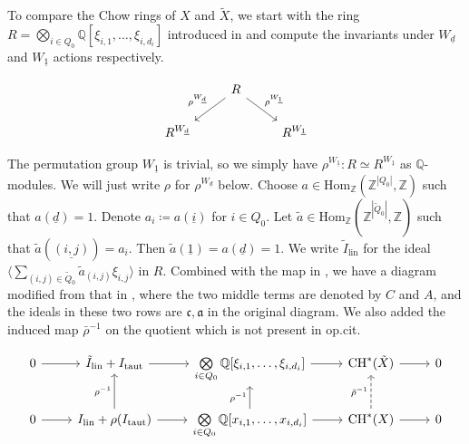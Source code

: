 \documentclass[11pt]{article}
\begin{document}
To compare the Chow rings of \(X\) and \(\tilde{X}\), we start with the ring \(R = \bigotimes_{i\in Q_0}\mathbb{Q}[\xi_{i, 1}, \dots, \xi_{i, d_i}]\) introduced in  and compute the invariants under \(W_{\underline{d}}\) and \(W_{\underline{1}}\) actions respectively. 

\[\begin{tikzcd}
	& R & \\
	{R^{W_{\underline{d}}}} && {R^{W_{\underline{1}}}}
	\arrow["{\rho^{W_{\underline{d}}}}"', from=1-2, to=2-1]
	\arrow["{\rho^{W_{\underline{1}}}}", from=1-2, to=2-3]
\end{tikzcd}\]

The permutation group \(W_{\underline{1}}\) is trivial, so we simply have \(\rho^{W_{\underline{1}}}: R\simeq R^{W_{\underline{1}}}\) as \(\mathbb{Q}\)-modules. We will just write \(\rho\) for \(\rho^{W_{\underline{d}}}\) below. Choose \(a\in \mathrm{Hom}_{\mathbb{Z}}(\mathbb{Z}^{|Q_0|}, \mathbb{Z})\) such that \(a({\underline{d}}) = 1\). Denote \(a_i\coloneqq a(\underline{i}) \) for \(i\in Q_0\). Let \(\tilde{a}\in \mathrm{Hom}_{\mathbb{Z}}(\mathbb{Z}^{|\tilde{Q}_0|}, \mathbb{Z})\) such that \(\tilde{a}(\underline{(i, j)}) = a_i\). Then \(\tilde{a}(\underline{1}) = a(\underline{d}) = 1\). We write \(\tilde{I}_{\text{lin}}\) for the ideal \(\langle \sum_{(i, j)\in \tilde{Q}_0}\tilde{a}_{(i, j)} \xi_{i,j}\rangle \) in \(R\). Combined with the map in , we have a diagram modified from that in \cite[Section 4.2]{franzen2015chow}, where the two middle terms are denoted by \(C\) and \(A\), and the ideals in these two rows are \(\mathfrak{c}, \mathfrak{a}\) in the original diagram. We also added the induced map \(\bar{\rho}^{-1}\) on the quotient which is not present in op.cit. 

\[\begin{tikzcd}
	0 & {\tilde{I}_{\text{lin}} + I_{\text{taut}}} & {\bigotimes\limits_{i\in Q_0}\mathbb{Q}[\xi_{i, 1}, \dots, \xi_{i, d_i}]} & {\mathrm{CH}^*(\tilde{X})} & 0 \\
	0 & {I_{\text{lin}} + \rho(I_{\text{taut}})} & {\bigotimes\limits_{i\in Q_0}\mathbb{Q}[x_{i, 1}, \dots, x_{i, d_i}]} & {\mathrm{CH}^*(X)} & 0
	\arrow[from=1-1, to=1-2]
	\arrow[from=1-2, to=1-3]
	\arrow[from=1-3, to=1-4]
	\arrow[from=1-4, to=1-5]
	\arrow[from=2-1, to=2-2]
	\arrow["\rho^{-1}", from=2-2, to=1-2]
	\arrow[from=2-2, to=2-3]
	\arrow["\rho^{-1}", from=2-3, to=1-3]
	\arrow[from=2-3, to=2-4]
	\arrow[from=2-4, to=2-5]
    \arrow[dashed, "\bar{\rho}^{-1}", from=2-4, to=1-4]
\end{tikzcd}\]
\end{document}
